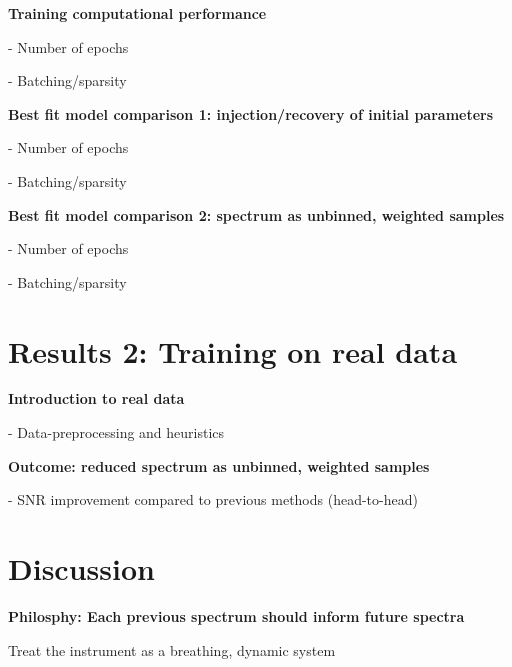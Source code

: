 \documentclass[twocolumn]{aastex63}
\begin{document}
\begin{mdframed}
  \textbf{Training computational performance} \par
  - Number of epochs\par
  - Batching/sparsity\par
  \textcolor{lightgray}{\lipsum[9]}
\end{mdframed}

\begin{mdframed}
  \textbf{Best fit model comparison 1: injection/recovery of initial parameters} \par
  - Number of epochs\par
  - Batching/sparsity\par
  \textcolor{lightgray}{\lipsum[10]}
\end{mdframed}

\begin{mdframed}
  \textbf{Best fit model comparison 2: spectrum as unbinned, weighted samples} \par
  - Number of epochs\par
  - Batching/sparsity\par
  \textcolor{lightgray}{\lipsum[11]}
\end{mdframed}


\section{Results 2: Training on real data}
\begin{mdframed}
  \textbf{Introduction to real data} \par
  - Data-preprocessing and heuristics \par
  \textcolor{lightgray}{\lipsum[12]}
\end{mdframed}

\begin{mdframed}
  \textbf{Outcome: reduced spectrum as unbinned, weighted samples} \par
  - SNR improvement compared to previous methods (head-to-head)\par
  \textcolor{lightgray}{\lipsum[13]}
\end{mdframed}

\pagebreak
\clearpage

\section{Discussion}\label{secDiscuss}

\begin{mdframed}
  \textbf{Philosphy: Each previous spectrum should inform future spectra} \par
  Treat the instrument as a breathing, dynamic system\par
  \textcolor{lightgray}{\lipsum[5]}
\end{mdframed}
\end{document}
